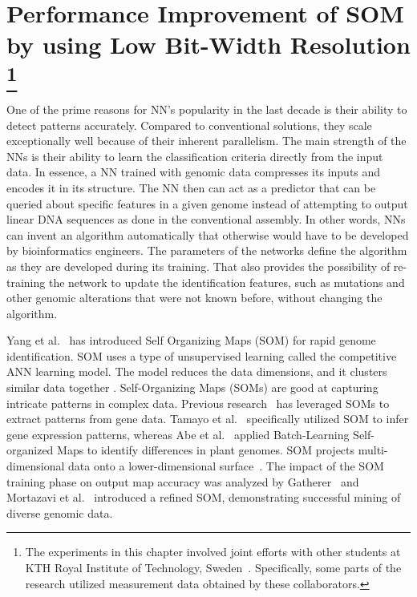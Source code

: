 \graphicspath{{./Ch5-SOM/images/}}

\chapter[Performance Improvement of SOM by using Low Bit-Width Resolution]{Performance Improvement of SOM by using Low Bit-Width Resolution \footnote{The experiments in this chapter involved joint efforts with other students at KTH Royal Institute of Technology, Sweden~\cite{Yang2018RiBoSOM}. Specifically, some parts of the research utilized measurement data obtained by these collaborators.}} 
\label{chap:SOM}
One of the prime reasons for NN's popularity in the last decade is their ability to detect patterns accurately. Compared to conventional solutions, they scale exceptionally well because of their inherent parallelism. The main strength of the NNs is their ability to learn the classification criteria directly from the input data. In essence, a NN trained with genomic data compresses its inputs and encodes it in its structure. The NN then can act as a predictor that can be queried about specific features in a given genome instead of attempting to output linear DNA sequences as done in the conventional assembly. In other words, NNs can invent an algorithm automatically that otherwise would have to be developed by bioinformatics engineers. The parameters of the networks define the algorithm as they are developed during its training. That also provides the possibility of re-training the network to update the identification features, such as mutations and other genomic alterations that were not known before, without changing the algorithm.

Yang et al.~\cite{Yang2018RiBoSOM} has introduced Self Organizing Maps (SOM) for rapid genome identification. SOM uses a type of unsupervised learning called the competitive ANN learning model. The model reduces the data dimensions, and it clusters similar data together \cite{Kohonen2013}. Self-Organizing Maps (SOMs) are good at capturing intricate patterns in complex data. Previous research~\cite{tamayo1999interpreting, abe2009novel, mortazavi2013integrating, kohonen1990self, gatherer2007genome} has leveraged SOMs to extract patterns from gene data. Tamayo et al.~\cite{tamayo1999interpreting} specifically utilized SOM to infer gene expression patterns, whereas Abe et al.~\cite{abe2009novel} applied Batch-Learning Self-organized Maps to identify differences in plant genomes. SOM projects multi-dimensional data onto a lower-dimensional surface~\cite{kohonen1990self}. The impact of the SOM training phase on output map accuracy was analyzed by Gatherer~\cite{gatherer2007genome} and Mortazavi et al.~\cite{mortazavi2013integrating} introduced a refined SOM, demonstrating successful mining of diverse genomic data.

